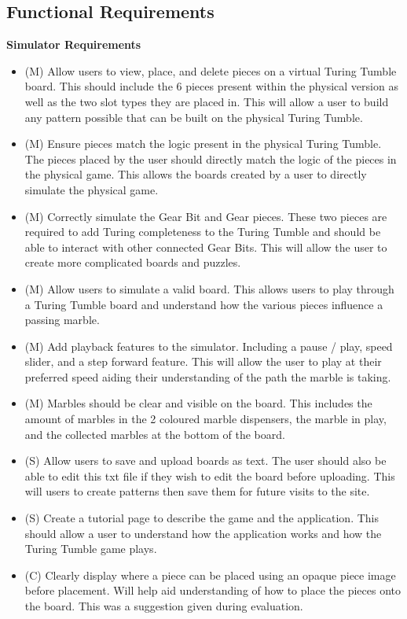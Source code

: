 \documentclass{l4proj}
\begin{document}
\subsection{Functional Requirements}
\textbf{Simulator Requirements}
\begin{itemize}
    \item (M) Allow users to view, place, and delete pieces on a virtual Turing Tumble board. This should include the 6 pieces present within the physical version as well as the two slot types they are placed in. This will allow a user to build any pattern possible that can be built on the physical Turing Tumble.
    \item (M) Ensure pieces match the logic present in the physical Turing Tumble. The pieces placed by the user should directly match the logic of the pieces in the physical game. This allows the boards created by a user to directly simulate the physical game.
    \item (M) Correctly simulate the Gear Bit and Gear pieces. These two pieces are required to add Turing completeness to the Turing Tumble and should be able to interact with other connected Gear Bits. This will allow the user to create more complicated boards and puzzles.
    \item (M) Allow users to simulate a valid board. This allows users to play through a Turing Tumble board and understand how the various pieces influence a passing marble.
    \item (M) Add playback features to the simulator. Including a pause / play, speed slider, and a step forward feature. This will allow the user to play at their preferred speed aiding their understanding of the path the marble is taking.
    \item (M) Marbles should be clear and visible on the board. This includes the amount of marbles in the 2 coloured marble dispensers, the marble in play, and the collected marbles at the bottom of the board.
    \item (S) Allow users to save and upload boards as text. The user should also be able to edit this txt file if they wish to edit the board before uploading. This will users to create patterns then save them for future visits to the site.
    \item (S) Create a tutorial page to describe the game and the application. This should allow a user to understand how the application works and how the Turing Tumble game plays.
    \item (C) Clearly display where a piece can be placed using an opaque piece image before placement. Will help aid understanding of how to place the pieces onto the board. This was a suggestion given during evaluation.

\end{itemize}
\end{document}
